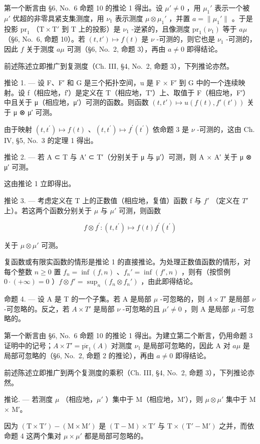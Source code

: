 第一个断言由 §6, No.~6 命题 10 的推论 1 得出。设 \(\mu' \neq 0\) ，用 \(\mu_1'\) 表示一个被 \(\mu'\) 优超的非零具紧支集测度，用 \(\nu_1\) 表示测度 \(\mu \otimes \mu_1'\) ，并置 \(a = \| \mu_1'\|\) 。于是投影 \(\mathrm{pr}_1\) （\(\mathrm{T} \times \mathrm{T}'\) 到 \(\mathrm{T}\) 上的投影）是 \(\nu_1\) -逆紧的，且像测度 \(\mathrm{pr}_1(\nu_1)\) 等于 \(a\mu\) （§6, No.~6, 命题 10）。若 \((t, t') \mapsto f(t)\) 是 \(\nu\) -可测的，则它也是 \(\nu_1\) -可测的，因此 \(f\) 关于测度 \(a\mu\) 可测（§6, No.~2, 命题 3），再由 \(a \neq 0\) 即得结论。

前述陈述立即推广到复测度（Ch. III, §4, No.~2, 命题 3），下列推论亦然。

推论 1. --- 设 F、F′ 和 G 是三个拓扑空间，u 是 F × F′ 到 G 中的一个连续映射。设 f（相应地，f′）是定义在 T（相应地，T′）上、取值于 F（相应地，F′）中且关于 μ（相应地，μ′）可测的函数。则函数 \((t, t') \mapsto u(f(t), f'(t'))\) 关于 μ ⊗ μ′ 可测。

由于映射 \((t,t^{\prime})\mapsto f(t)\) 、\((t,t^{\prime})\mapsto f^{\prime}(t^{\prime})\) 依命题 3 是 \(\nu\) -可测的，这由 Ch. IV, §5, No.~3 的定理 1 得出。

推论 2. --- 若 A ⊂ T 与 A′ ⊂ T′（分别关于 μ 与 μ′）可测，则 A × A′ 关于 μ ⊗ μ′ 可测。

这由推论 1 立即得出。

推论 3. --- 考虑定义在 T 上的正数值（相应地，复值）函数 f 与 \(f'\) （定义在 \(T'\) 上）。若这两个函数分别关于 \(\mu\) 与 \(\mu'\) 可测，则函数

\[
f \otimes f ^ {\prime}: (t, t ^ {\prime}) \mapsto f (t) f ^ {\prime} (t ^ {\prime})
\]

关于 \(\mu \otimes \mu'\) 可测。

复函数或有限实函数的情形是推论 1 的直接推论。为处理正数值函数的情形，对每个整数 \(n \geqslant 0\) 置 \(f_n = \inf(f, n)\) 、\(f_n' = \inf(f', n)\) ，则有（按惯例 \(0 \cdot (+\infty) = 0\) ）\(f \otimes f' = \sup_n(f_n \otimes f_n')\) ，由此即得结论。

命题 4. --- 设 A 是 T 的一个子集。若 A 是局部 \(\mu\) -可忽略的，则 \(A \times T'\) 是局部 \(\nu\) -可忽略的。反之，若 \(A \times T'\) 是局部 \(\nu\) -可忽略的且 \(\mu' \neq 0\) ，则 A 是局部 \(\mu\) -可忽略的。

第一个断言由 §6, No.~6 命题 10 的推论 1 得出。为建立第二个断言，仍用命题 3 证明中的记号；\(A \times T' = \overline{\text{pr}}_{1}(A)\) 对测度 \(\nu_{1}\) 是局部可忽略的，因此 A 对 \(a\mu\) 是局部可忽略的（§6, No.~2, 命题 2 的推论），再由 \(a \neq 0\) 即得结论。

前述陈述立即推广到两个复测度的乘积（Ch. III, §4, No.~2, 命题 3），下列推论亦然。

推论. --- 若测度 \(\mu\) （相应地，\(\mu'\) ）集中于 M（相应地，M′），则 \(\mu \otimes \mu'\) 集中于 M × M′。

因为 \((\mathrm{T} \times \mathrm{T}') - (\mathrm{M} \times \mathrm{M}')\) 是 \((\mathrm{T} - \mathrm{M}) \times \mathrm{T}'\) 与 \(\mathrm{T} \times (\mathrm{T}' - \mathrm{M}')\) 之并，而依命题 4 这两个集对 \(\mu \times \mu'\) 都是局部可忽略的。


